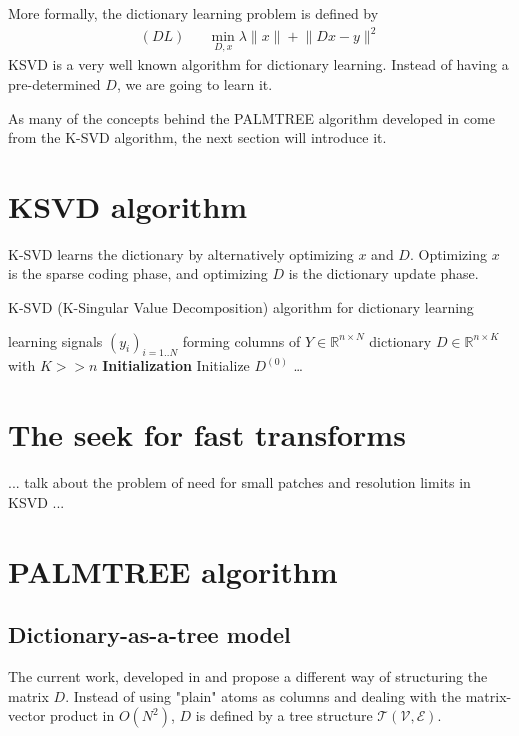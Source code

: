 More formally, the dictionary learning problem is defined by
\begin{equation*}
\begin{aligned}
(DL) && \underset{D,x}{\min} \lambda \lVert x \rVert + \lVert Dx-y \rVert^2
\end{aligned}
\end{equation*}
\ac{KSVD} is a very well known algorithm for dictionary learning. Instead of having a pre-determined $D$, we are going to learn it.

As many of the concepts behind the PALMTREE algorithm developed in \cite{chabiron_optimization_2016} come from the K-SVD algorithm, the next section will introduce it.


\section{\ac{KSVD} algorithm}

K-SVD learns the dictionary by alternatively optimizing $x$ and $D$. Optimizing $x$ is the sparse coding phase, and optimizing $D$ is the dictionary update phase.


\begin{algorithm} %
    \caption{K-SVD (K-Singular Value Decomposition) algorithm for dictionary learning}
  \begin{algorithmic}[1]
    \Input learning signals $(y_i)_{i=1..N}$ forming columns of $Y \in \mathbb{R}^{n \times N}$
    \Output dictionary $D \in \mathbb{R}^{n \times K}$ with $K>>n$
    \State \textbf{Initialization} Initialize $D^{(0)}$
	\State \dots
    \EndWhile
  \end{algorithmic}
\end{algorithm}
\section{The seek for fast transforms}
... talk about the problem of need for small patches and resolution limits in KSVD ...

\section{PALMTREE algorithm}

\subsection{Dictionary-as-a-tree model \label{sec_tree_model}}
The current work, developed in \cite{chabiron_toward_2015} and \cite{chabiron_optimization_2016} propose a different way of structuring the matrix $D$. Instead of using "plain" atoms as columns and dealing with the matrix-vector product in $O(N^2)$, $D$ is defined by a tree structure $\mathcal{T}(\mathcal{V},\mathcal{E})$. 

